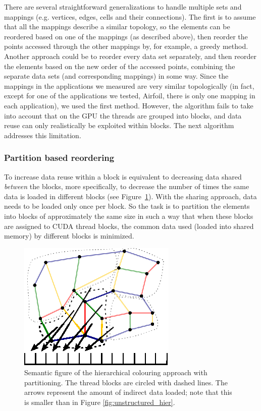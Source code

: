 There are several straightforward generalizations to handle multiple sets and
mappings (e.g. vertices, edges, cells and their connections).  The first is to
assume that all the mappings describe a similar topology, so the elements can be
reordered based on one of the mappings (as described above), then reorder the
points accessed through the other mappings by, for example, a greedy method.
Another approach could be to reorder every data set separately, and then reorder
the elements based on the new order of the accessed points, combining the
separate data sets (and corresponding mappings) in some way. Since the mappings
in the applications we measured are very similar topologically (in fact, except
for one of the applications we tested, Airfoil, there is only one mapping in 
each application), we used the first method. However, the algorithm fails to 
take into account that on the GPU the threads are grouped into blocks, and data 
reuse can only realistically be exploited within blocks. The next algorithm 
addresses this limitation.

\subsubsection{Partition based reordering}

\noindent To increase data reuse within a block is equivalent to decreasing 
data shared \emph{between} the blocks, more specifically, to decrease the 
number of times the same data is loaded in different blocks (see 
Figure~\ref{fig:unstructured_part}). With the sharing approach, data needs to be 
loaded only once per block. So the task is to partition the elements into 
blocks of approximately the same size in such a way that when these blocks are 
assigned to CUDA thread blocks, the common data used (loaded into shared 
memory) by different blocks is minimized.

\begin{figure}[Htpb]
  \centering
  \includegraphics{fig/svg/unstructured_part.eps}
  \caption{Semantic figure of the hierarchical colouring approach with
  partitioning. The thread blocks are circled with dashed lines. The arrows
  represent the amount of indirect data loaded; note that this is smaller than
  in Figure \ref{fig:unstructured_hier}.}
  \label{fig:unstructured_part}
\end{figure}

